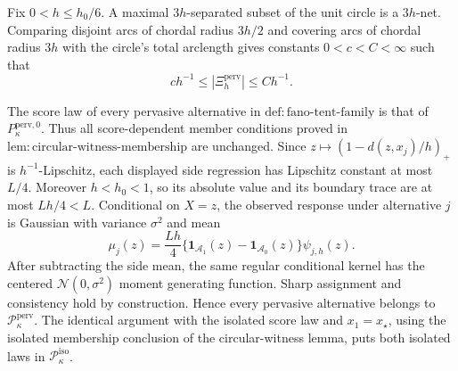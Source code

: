 Fix \(0<h\le h_0/6\).  A maximal \(3h\)-separated subset of the unit
circle is a \(3h\)-net.  Comparing disjoint arcs of chordal radius
\(3h/2\) and covering arcs of chordal radius \(3h\) with the circle's
total arclength gives constants \(0<c<C<\infty\) such that
\[
 c h^{-1}\le |\Xi_h^{\mathrm{perv}}|\le C h^{-1}.
 \tag{11}
\]

The score law of every pervasive alternative in
\(\mathrm{def:fano\text{-}tent\text{-}family}\) is that of
\(P_{\kappa}^{\mathrm{perv},0}\).  Thus all score-dependent member
conditions proved in \(\mathrm{lem:circular\text{-}witness\text{-}membership}\)
are unchanged.  Since \(z\mapsto(1-d(z,x_j)/h)_+\) is
\(h^{-1}\)-Lipschitz, each displayed side regression has Lipschitz
constant at most \(L/4\).  Moreover \(h<h_0<1\), so its absolute value
and its boundary trace are at most \(Lh/4<L\).  Conditional on \(X=z\),
the observed response under alternative \(j\) is Gaussian with variance
\(\sigma^2\) and mean
\[
 \mu_j(z)=\frac{Lh}{4}\{\mathbf1_{\mathcal A_1}(z)
              -\mathbf1_{\mathcal A_0}(z)\}\psi_{j,h}(z).
 \tag{12}
\]
After subtracting the side mean, the same regular conditional kernel has
the centered \(\mathcal N(0,\sigma^2)\) moment generating function.
Sharp assignment and consistency hold by construction.  Hence every
pervasive alternative belongs to
\(\mathcal P_{\kappa}^{\mathrm{perv}}\).  The identical argument with
the isolated score law and \(x_1=x_{\star}\), using the isolated
membership conclusion of the circular-witness lemma, puts both isolated
laws in \(\mathcal P_{\kappa}^{\mathrm{iso}}\).

